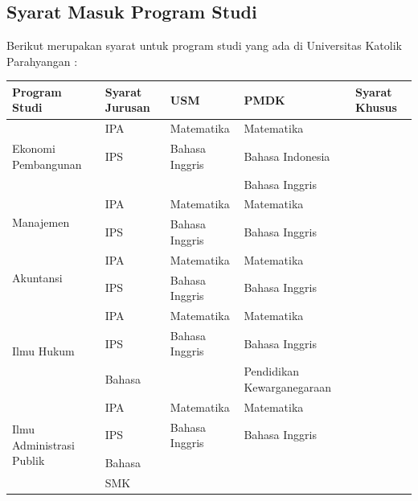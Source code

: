 \subsection{Syarat Masuk Program Studi}
Berikut merupakan syarat untuk program studi yang ada di Universitas Katolik Parahyangan :
\begin{longtable}[H]{|p{3cm}|p{2cm}|p{3cm}|p{3cm}|p{3cm}|} %

		\hline
		Program Studi & Syarat Jurusan & USM  & PMDK & Syarat Khusus \\

		\hline
		\multirow{3}{10em}{Ekonomi Pembangunan} & IPA & Matematika & Matematika & \\
		& IPS & Bahasa Inggris & Bahasa Indonesia & \\
		& & & Bahasa Inggris & \\
		
		\hline
		\multirow{2}{10em}{Manajemen} & IPA & Matematika & Matematika & \\
		& IPS & Bahasa Inggris & Bahasa Inggris & \\
		
		\hline
		\multirow{2}{10em}{Akuntansi} & IPA & Matematika & Matematika & \\
		& IPS & Bahasa Inggris & Bahasa Inggris & \\
		
		
		\hline
		\multirow{3}{10em}{Ilmu Hukum} & IPA & Matematika & Matematika & \\
		& IPS & Bahasa Inggris & Bahasa Inggris & \\
		& Bahasa & & Pendidikan Kewarganegaraan & \\
		
		\hline
		\multirow{4}{10em}{Ilmu Administrasi Publik} & IPA & Matematika & Matematika & \\
		& IPS & Bahasa Inggris & Bahasa Inggris & \\
		& Bahasa & & & \\
		& SMK & & & \\
		

\end{longtable}

